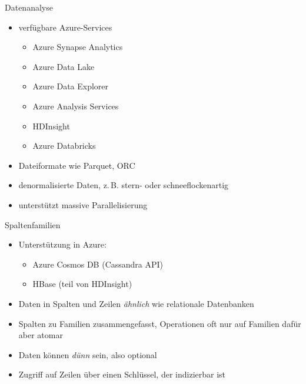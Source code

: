 \begin{flashcard}[Definition]{Datenanalyse}
  \begin{itemize}
    \item verfügbare Azure-Services
      \begin{itemize}
        \item Azure Synapse Analytics
        \item Azure Data Lake
        \item Azure Data Explorer
        \item Azure Analysis Services
        \item HDInsight
        \item Azure Databricks
      \end{itemize}
    \item Dateiformate wie Parquet, ORC
    \item denormalisierte Daten, z.\,B. stern- oder schneeflockenartig
    \item unterstützt massive Parallelisierung
  \end{itemize}
\end{flashcard}

\begin{flashcard}[Definition]{Spaltenfamilien}
  \begin{itemize}
    \item Unterstützung in Azure:
      \begin{itemize}
         \item Azure Cosmos DB (Cassandra API)
         \item HBase (teil von HDInsight)
      \end{itemize}
    \item Daten in Spalten und Zeilen \emph{ähnlich} wie relationale Datenbanken
    \item Spalten zu Familien zusammengefasst, Operationen oft nur auf Familien\newline
    dafür aber atomar
    \item Daten können \emph{dünn} sein, also optional
    \item Zugriff auf Zeilen über einen Schlüssel, der indizierbar ist
  \end{itemize}
\end{flashcard}


